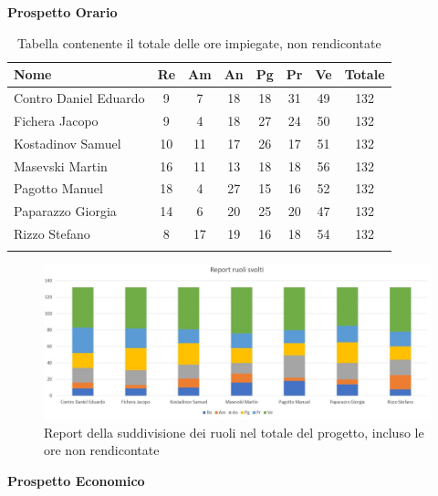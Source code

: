 \documentclass[../piano_di_progetto.tex]{subfiles}
\begin{document}
\textbf{Prospetto Orario}

\begin{center}
	\begin{longtable}{|l|c|c|c|c|c|c|c|}
		\hline
		\rowcolor{lightgray}
		\textbf{Nome} & \textbf{Re} & \textbf{Am} & \textbf{An} & \textbf{Pg}  & \textbf{Pr}   & \textbf{Ve} & \textbf{Totale} \\

		\hline
			Contro Daniel Eduardo & 9 & 7 & 18 & 18 & 31 & 49 & 132 \\
		\hline
			Fichera Jacopo & 9 & 4 & 18 & 27 & 24 & 50 & 132 \\
		\hline
			Kostadinov Samuel & 10 & 11 & 17 & 26 & 17 & 51 & 132 \\
		\hline
			Masevski Martin & 16 & 11 & 13 & 18 & 18 & 56 & 132 \\
		\hline
			Pagotto Manuel & 18 & 4 & 27 & 15 & 16 & 52 & 132 \\			
		\hline
			Paparazzo Giorgia & 14 & 6 & 20 & 25 & 20 & 47 & 132 \\
		\hline
			Rizzo Stefano & 8 & 17 & 19 & 16 & 18 & 54 & 132 \\
		\hline	

		\caption{Tabella contenente il totale delle ore impiegate, non rendicontate}
	\end{longtable}
\end{center}

\begin{figure}[H]
\centering
\includegraphics[width=12cm]{img/report_ruoli_tot}
\caption{Report della suddivisione dei ruoli nel totale del progetto, incluso le ore non rendicontate}
\end{figure}

\textbf{Prospetto Economico}
\end{document}
